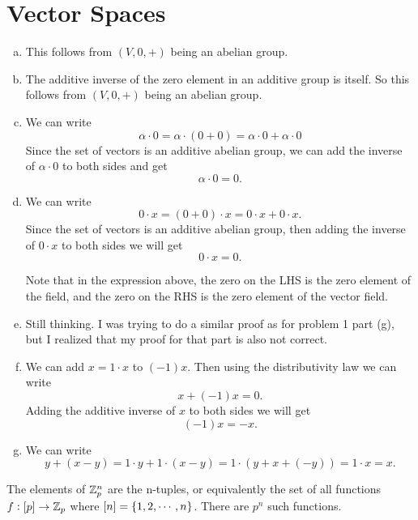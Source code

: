 \section{Vector Spaces}
\begin{problem}
	\begin{solution}
		\begin{enumerate}[(a)]
			\item This follows from $ (V,0,+) $ being an abelian group.
			\item The additive inverse of the zero element in an additive group is itself. So this follows from $ (V,0,+) $ being an abelian group.
			\item We can write
			\[ \alpha\cdot0 = \alpha\cdot(0 + 0) = \alpha\cdot 0 + \alpha\cdot 0 \]
			Since the set of vectors is an additive abelian group, we can add the inverse of $ \alpha\cdot 0 $ to both sides and get
			\[ \alpha\cdot 0 = 0. \]
			\item We can write
			\[ 0\cdot x = (0+0)\cdot x = 0\cdot x + 0\cdot x. \]
			Since the set of vectors is an additive abelian group, then adding the inverse of $ 0\cdot x $ to both sides we will get
			\[ 0\cdot x = 0. \]
			\begin{remark}
				Note that in the expression above, the zero on the LHS is the zero element of the field, and the zero on the RHS is the zero element of the vector field. 
			\end{remark}
			\item {\color{red} \noindent Still thinking. I was trying to do a similar proof as for problem 1 part (g), but I realized that my proof for that part is also not correct.}
			
			\item We can add $ x = 1\cdot x $ to $ (-1)x $. Then using the distributivity law we can write
			\[ x + (-1)x = 0. \]
			Adding the additive inverse of $ x $ to both sides we will get
			\[ (-1)x = -x. \]
			
			\item We can write
			\[ y + (x-y) = 1\cdot y + 1\cdot (x-y) = 1\cdot(y+x+(-y)) = 1\cdot x = x. \]
 		\end{enumerate}
	\end{solution}
\end{problem}

\begin{problem}
	The elements of $ \mathbb{Z}_p^n $ are the n-tuples, or equivalently the set of all functions $ f:[p]\to \mathbb{Z}_p $ where $ [n]= \{1,2,\cdots,n\} $. There are $ p^n $ such functions. 
\end{problem}


